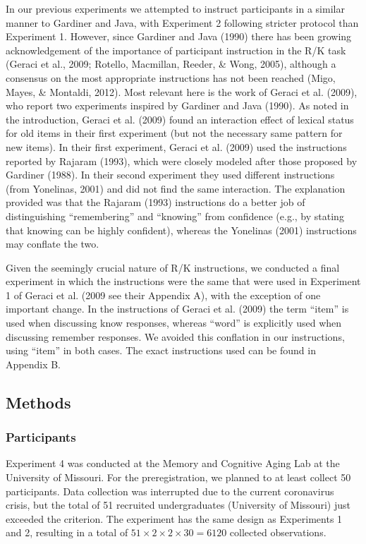 \documentclass[english,,man,floatsintext]{apa6}
\begin{document}
In our previous experiments we attempted to instruct participants in a similar manner to Gardiner and Java, with Experiment 2 following stricter protocol than Experiment 1. However, since Gardiner and Java (1990) there has been growing acknowledgement of the importance of participant instruction in the R/K task (Geraci et al., 2009; Rotello, Macmillan, Reeder, \& Wong, 2005), although a consensus on the most appropriate instructions has not been reached (Migo, Mayes, \& Montaldi, 2012). Most relevant here is the work of Geraci et al. (2009), who report two experiments inspired by Gardiner and Java (1990). As noted in the introduction, Geraci et al. (2009) found an interaction effect of lexical status for old items in their first experiment (but not the necessary same pattern for new items). In their first experiment, Geraci et al. (2009) used the instructions reported by Rajaram (1993), which were closely modeled after those proposed by Gardiner (1988). In their second experiment they used different instructions (from Yonelinas, 2001) and did not find the same interaction. The explanation provided was that the Rajaram (1993) instructions do a better job of distinguishing \enquote{remembering} and \enquote{knowing} from confidence (e.g., by stating that knowing can be highly confident), whereas the Yonelinas (2001) instructions may conflate the two.

Given the seemingly crucial nature of R/K instructions, we conducted a final experiment in which the instructions were the same that were used in Experiment 1 of Geraci et al. (2009 see their Appendix A), with the exception of one important change. In the instructions of Geraci et al. (2009) the term \enquote{item} is used when discussing know responses, whereas \enquote{word} is explicitly used when discussing remember responses. We avoided this conflation in our instructions, using \enquote{item} in both cases. The exact instructions used can be found in Appendix B.

\hypertarget{methods-3}{%
\subsection{Methods}\label{methods-3}}

\hypertarget{participants-2}{%
\subsubsection{Participants}\label{participants-2}}

Experiment 4 was conducted at the Memory and Cognitive Aging Lab at the University of Missouri. For the preregistration, we planned to at least collect 50 participants. Data collection was interrupted due to the current coronavirus crisis, but the total of 51 recruited undergraduates (University of Missouri) just exceeded the criterion. The experiment has the same design as Experiments 1 and 2, resulting in a total of \(51 \times 2 \times 2 \times 30 = 6120\) collected observations.
\end{document}
